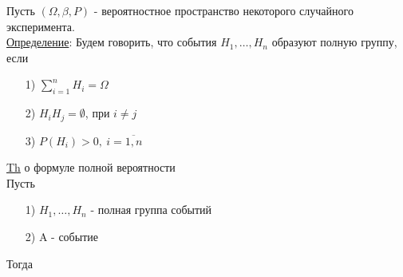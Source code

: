 
Пусть $(\Omega, \beta, P)$ - вероятностное пространство некоторого случайного эксперимента. \\
\underline{Определение}: Будем говорить, что события $H_1, \ldots, H_n$ образуют полную группу, если \\
\begin{enumerate}
\item[1)] $\sum\limits_{i = 1}^{n} H_i = \Omega$ \\

\item[2)] $H_i H_j = \emptyset$, при $i \neq j$ \\

\item[3)] $P(H_i) > 0, \ i = \overline{1,n}$ \\
\end{enumerate}


\underline{Th} о формуле полной вероятности \\
Пусть \\
\begin{enumerate}
\item[1)] $H_1, \ldots, H_n$ - полная группа событий \\

\item[2)] A - событие
\end{enumerate}
Тогда \\
 \\


